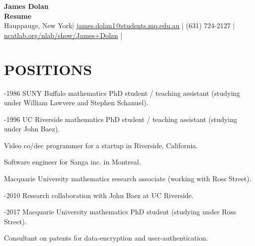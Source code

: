 \documentclass[a4paper,9pt]{extarticle}
\begin{document}
\pagestyle{empty}

\begin{center}
\textbf{\Large James Dolan}\\[3pt] %
\textbf{Resume}\\[1pt] %
Hauppauge, New York| \href{mailto:james.dolan1@students.mq.edu.au}{james.dolan1@students.mq.edu.au} | (631) 724-2127 | \href{https://ncatlab.org/nlab/show/James+Dolan}{ncatlab.org/nlab/show/James+Dolan} | %
\end{center}


\section*{POSITIONS}

\noindent
{}-1986
SUNY Buffalo mathematics PhD student / teaching assistant 
(studying under William Lawvere and Stephen Schanuel).

-1996
UC Riverside mathematics PhD student / teaching assistant 
(studying under John Baez).

Video co/dec programmer for a startup in Riverside, California.

Software engineer for Sanga inc. in Montreal.

Macquarie University mathematics research associate 
(working with Ross Street).

-2010
Research collaboration with John Baez at UC Riverside.

-2017
Macquarie University mathematics PhD student (studying under Ross Street).

Consultant on patents for data-encryption and user-authentication.


\end{document}
